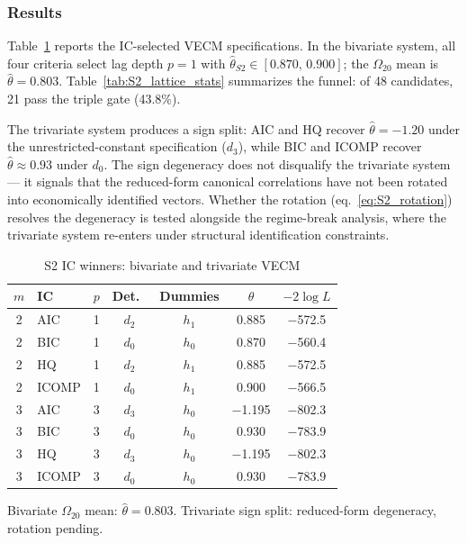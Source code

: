 
\subsubsection{Results}
\label{subsec:S2_results}

Table~\ref{tab:S2_ic_winners} reports the IC-selected VECM specifications.
In the bivariate system, all four criteria select lag depth $p = 1$ with
$\hat{\theta}_{S2} \in [0.870,\, 0.900]$; the $\Omega_{20}$ mean is
$\hat{\theta} = 0.803$. Table~\ref{tab:S2_lattice_stats} summarizes the
funnel: of 48 candidates, 21 pass the triple gate (43.8\%).

The trivariate system produces a sign split: AIC and HQ recover
$\hat{\theta} = -1.20$ under the unrestricted-constant specification
($d_3$), while BIC and ICOMP recover $\hat{\theta} \approx 0.93$ under
$d_0$. The sign degeneracy does not disqualify the trivariate system --- it
signals that the reduced-form canonical correlations have not been rotated
into economically identified vectors. Whether the rotation
(eq.~\ref{eq:S2_rotation}) resolves the degeneracy is tested alongside the
regime-break analysis, where the trivariate system re-enters under
structural identification constraints.

\begin{table}[!ht]
	\centering
	\small
	\caption{S2 IC winners: bivariate and trivariate VECM}
	\label{tab:S2_ic_winners}
	\begin{tabular}{clccccc}
		\hline\hline
		$m$ & IC & $p$ & Det.\ & Dummies & $\hat{\theta}$ & $-2\log L$ \\
		\hline
		2 & AIC   & 1 & $d_2$ & $h_1$ & 0.885 & $-$572.5 \\
		2 & BIC   & 1 & $d_0$ & $h_0$ & 0.870 & $-$560.4 \\
		2 & HQ    & 1 & $d_2$ & $h_1$ & 0.885 & $-$572.5 \\
		2 & ICOMP & 1 & $d_0$ & $h_1$ & 0.900 & $-$566.5 \\
		\hline
		3 & AIC   & 3 & $d_3$ & $h_0$ & $-$1.195 & $-$802.3 \\
		3 & BIC   & 3 & $d_0$ & $h_0$ & 0.930     & $-$783.9 \\
		3 & HQ    & 3 & $d_3$ & $h_0$ & $-$1.195 & $-$802.3 \\
		3 & ICOMP & 3 & $d_0$ & $h_0$ & 0.930     & $-$783.9 \\
		\hline
	\end{tabular}
	\par\vspace{0.3em}
	\footnotesize
	Bivariate $\Omega_{20}$ mean: $\hat{\theta} = 0.803$.
	Trivariate sign split: reduced-form degeneracy, rotation pending.
\end{table}

